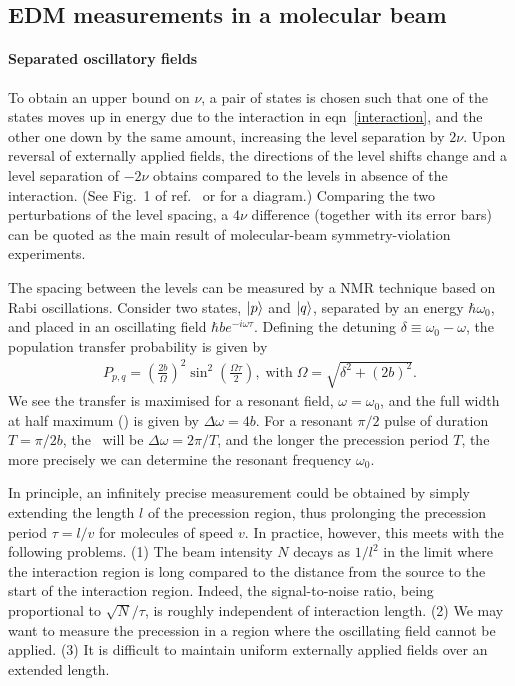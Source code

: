\subsection{EDM measurements in a molecular beam}

\paragraph{Separated oscillatory fields}

To obtain an upper bound on $\nu$, a pair of states is chosen such that one of
the states moves up in energy due to the interaction in eqn~\ref{interaction},
and the other one down by the same amount, increasing the level separation by
$2\nu$. Upon reversal of externally applied fields, the directions of the level
shifts change and a level separation of $-2\nu$ obtains compared to the levels
in absence of the interaction. (See Fig.~1 of ref.~\cite{hinds1980experiment} or
\cite{wilkening1984search} for a diagram.) Comparing the two perturbations of
the level spacing, a $4\nu$ difference (together with its error bars) can be
quoted as the main result of molecular-beam symmetry-violation experiments.

The spacing between the levels can be measured by a \gls{NMR} technique based on
Rabi oscillations. Consider two states, $|p\rangle$ and $|q\rangle$, separated by an
energy $\hbar\omega_0$, and placed in an oscillating field $\hbar b
e^{-i\omega\tau}$.  Defining the detuning $\delta\equiv\omega_0-\omega$, the
population transfer probability is given by \cite[eqn~V.10]{ramsey1956molecular}
%
\begin{align*}
    P_{p,q}=
    \left(\frac{2b}{\Omega}\right)^2
    \sin^2
    \left(
    \frac{\Omega\tau}{2}
    \right),
    \;\text{with}\;
    \Omega=\sqrt{\delta^2+(2b)^2}.
\end{align*}
%
We see the transfer is maximised for a resonant field, $\omega=\omega_0$, and
the full width at half maximum (\FWHM) is given by $\Delta\omega=4b$. For a
resonant $\pi/2$ pulse of duration $T=\pi/2b$, the \FWHM\ will be
$\Delta\omega=2\pi/T$, and the longer the precession period $T$, the more
precisely we can determine the resonant frequency $\omega_0$.

In principle, an infinitely precise measurement could be obtained by simply
extending the length $l$ of the precession region, thus prolonging the
precession period $\tau=l/v$ for molecules of speed $v$. In practice, however,
this meets with the following problems. (1) The beam intensity $N$ decays as
$1/l^2$ in the limit where the interaction region is long compared to the
distance from the source to the start of the interaction region. Indeed, the
signal-to-noise ratio, being proportional to $\sqrt{N}/\tau$, is roughly
independent of interaction length. (2) We may want to measure the precession in
a region where the oscillating field cannot be applied. (3) It is difficult to
maintain uniform externally applied fields over an extended length.

